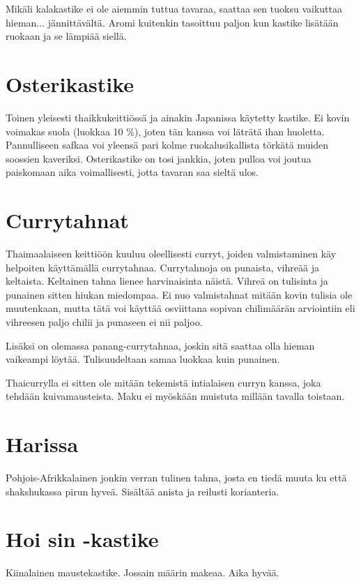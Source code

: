 \documentclass[../keittiokirja.tex]{subfiles}
\begin{document}
Mikäli kalakastike ei ole aiemmin tuttua tavaraa, saattaa sen tuoksu vaikuttaa hieman... jännittävältä. 
Aromi kuitenkin tasoittuu paljon kun kastike lisätään ruokaan ja se lämpiää siellä. 

\section{Osterikastike}
\label{sec:osterikastike}

Toinen yleisesti thaikkukeittiössä ja ainakin Japanissa käytetty kastike. Ei kovin voimakas 
suola (luokkaa 10 \%), joten tän kanssa voi läträtä ihan huoletta. Pannulliseen safkaa voi yleensä pari 
kolme ruokalusikallista törkätä muiden soossien kaveriksi. Osterikastike on tosi jankkia, joten pulloa voi 
joutua paiskomaan aika voimallisesti, jotta tavaran saa sieltä ulos.

\section{Currytahnat}
\label{sec:currytahnat}

Thaimaalaiseen keittiöön kuuluu oleellisesti curryt, joiden valmistaminen käy helpoiten käyttämällä currytahnaa. 
Currytahnoja on punaista, vihreää ja keltaista. Keltainen tahna lienee harvinaisinta näistä. Vihreä on tulisinta ja 
punainen sitten hiukan miedompaa. Ei nuo valmistahnat mitään kovin tulisia ole muutenkaan, mutta tätä voi käyttää 
osviittana sopivan chilimäärän arviointiin eli vihreesen paljo chilii ja punaseen ei nii paljoo.

Lisäksi on olemassa panang-currytahnaa, joskin sitä saattaa olla hieman vaikeampi löytää. Tulisuudeltaan samaa
luokkaa kuin punainen. 

Thaicurrylla ei sitten ole mitään tekemistä intialaisen curryn kanssa, joka tehdään kuivamausteista. Maku ei myöskään 
muistuta millään tavalla toistaan. 

\section{Harissa}
\label{sec:harissa}

Pohjois-Afrikkalainen jonkin verran tulinen tahna, josta en tiedä muuta ku että shakshukassa pirun hyveä. Sisältää 
anista ja reilusti korianteria.

\section{Hoi sin -kastike}
\label{sec:hoisinkastike}

Kiinalainen maustekastike. Jossain määrin makeaa. Aika hyvää. 
\end{document}
